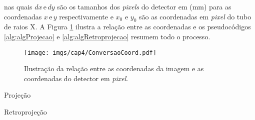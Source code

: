  \noindent nas quais $dx\,\text{e}\,dy$ são os tamanhos dos \textit{pixels} do detector em (mm) para as coordenadas $x\,\text{e}\,y$ respectivamente e $x_{0}$ e $y_{0}$ são as coordenadas em \textit{pixel} do tubo de raios X. A Figura \ref{fig:imgCap4ConversaoCoord} ilustra a relação entre as coordenadas e os pseudocódigos \ref{alg:algProjecao} e \ref{alg:algRetroprojecao} resumem todo o processo.  
 
 \begin{figure}[htb]
 	\caption{Ilustração da relação entre as coordenadas da imagem e as coordenadas do detector em \textit{pixel}.}
 	\begin{center}
 		\texttt{[image: imgs/cap4/ConversaoCoord.pdf]}
 	\end{center}
 	\label{fig:imgCap4ConversaoCoord}
\end{figure} 

\begin{algorithm}[htb]
	\SetAlgoLined
	\LinesNumberedHidden
	\caption{Projeção}
	\label{alg:algProjecao}	
\end{algorithm}


\begin{algorithm}[htb]
	\caption{Retroprojeção}
	\label{alg:algRetroprojecao}
\end{algorithm} 

